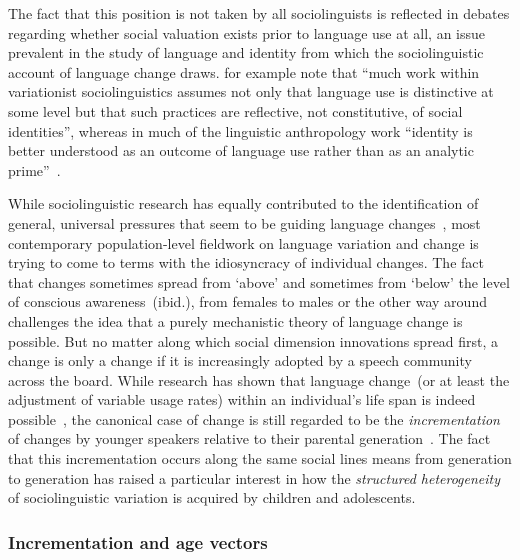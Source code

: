The fact that this position is not taken by all sociolinguists is reflected in debates regarding whether social valuation exists prior to language use at all, an issue prevalent in the study of language and identity from which the sociolinguistic account of language change draws. \citeauthor{Bucholtz2004} for example note that ``much work within variationist sociolinguistics assumes not only that language use is distinctive at some level but that such practices are reflective, not constitutive, of social identities'', whereas in much of the linguistic anthropology work ``identity is better understood as an outcome of language use rather than as an analytic prime''~\citep[p.376]{Bucholtz2004}.

While sociolinguistic research has equally contributed to the identification of general, universal pressures that seem to be guiding language changes~\citep[see][for an extensive summary in relation to sound changes in particular]{Labov1994}, most contemporary population-level fieldwork on language variation and change is trying to come to terms with the idiosyncracy of individual changes. The fact that changes sometimes spread from `above' and sometimes from `below' the level of conscious awareness~(ibid.), from females to males or the other way around~\citep{Trudgill1972,Milroy1985,Eckert1989,Labov2001,Sundgren2001} challenges the idea that a purely mechanistic theory of language change is possible.
But no matter along which social dimension innovations spread first, a change is only a change if it is increasingly adopted by a speech community across the board. While research has shown that %
language change~(or at least the adjustment of variable usage rates) within an individual's life span is indeed possible~\citep{Sankoff2007,Buchstaller2015}, the canonical case of change is still regarded to be the \emph{incrementation} of changes by younger speakers relative to their parental generation~\citep{Labov2001,Tagliamonte2009}. The fact that this incrementation occurs along the same social lines means from generation to generation has raised a particular interest in how the \emph{structured heterogeneity} of sociolinguistic variation is acquired by children and adolescents.

\subsubsection{Incrementation and age vectors}
\label{sec:agevector}


